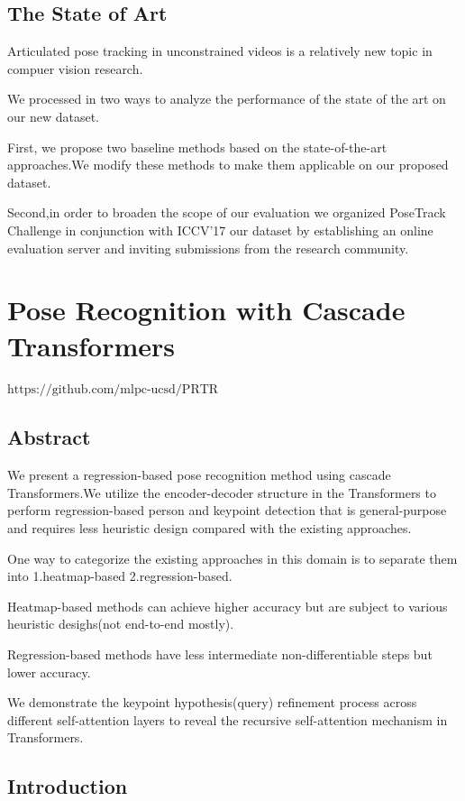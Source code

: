 \documentclass[11pt]{article}
\begin{document}
\subsection{The State of Art}

Articulated pose tracking in unconstrained videos is a relatively new topic in compuer vision research.

We processed in two ways to analyze the performance of the state of the art on our new dataset.

First, we propose two baseline methods based on the state-of-the-art approaches.We modify these methods to make them applicable on our proposed dataset.

Second,in order to broaden the scope of our evaluation we organized PoseTrack Challenge in conjunction with ICCV'17 our dataset by establishing an online evaluation server and inviting submissions from the research community.

\section{Pose Recognition with Cascade Transformers}
$\text{https://github.com/mlpc-ucsd/PRTR}$
\subsection{Abstract}

We present a regression-based pose recognition method using cascade Transformers.We utilize the encoder-decoder structure in the Transformers to perform regression-based person and keypoint detection that is general-purpose and requires less heuristic design compared with the existing approaches.

One way to categorize the existing approaches in this domain is to separate them into 1.heatmap-based 2.regression-based.

Heatmap-based methods can achieve higher accuracy but are subject to various heuristic desighs(not end-to-end mostly).

Regression-based methods have less intermediate non-differentiable steps but lower accuracy.

We demonstrate the keypoint hypothesis(query) refinement process across different self-attention layers to reveal the recursive self-attention mechanism in Transformers. 

\subsection{Introduction}
\end{document}
